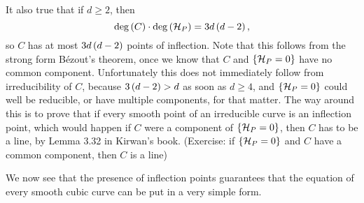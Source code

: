 \begin{remark}
\label{rem:13.6}
It also true that if $ d \ge 2 $, then
$$ \deg\left( C \right) \cdot \deg\left( \mathcal{H}_P \right) = 3d\left( d - 2 \right), $$
so $ C $ has at most $ 3d\left( d - 2 \right) $ points of inflection. Note that this follows from the strong form B\'ezout's theorem, once we know that $ C $ and $ \left\{ \mathcal{H}_P = 0 \right\} $ have no common component. Unfortunately this does not immediately follow from irreducibility of $ C $, because $ 3\left( d - 2 \right) > d $ as soon as $ d \ge 4 $, and $ \left\{ \mathcal{H}_P = 0 \right\} $ could well be reducible, or have multiple components, for that matter. The way around this is to prove that if every smooth point of an irreducible curve is an inflection point, which would happen if $ C $ were a component of $ \left\{ \mathcal{H}_P = 0 \right\} $, then $ C $ has to be a line, by Lemma 3.32 in Kirwan's book. (Exercise: if $ \left\{ \mathcal{H}_P = 0 \right\} $ and $ C $ have a common component, then $ C $ is a line)
\end{remark}

We now see that the presence of inflection points guarantees that the equation of every smooth cubic curve can be put in a very simple form.

\pagebreak

